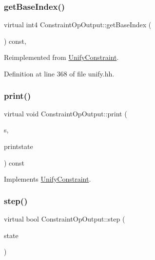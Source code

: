 \subsubsection{\texorpdfstring{getBaseIndex()}{getBaseIndex()}}
{\footnotesize\ttfamily virtual int4 Constraint\+Op\+Output\+::get\+Base\+Index (\begin{DoxyParamCaption}\item[{void}]{ }\end{DoxyParamCaption}) const\hspace{0.3cm}{\ttfamily [inline]}, {\ttfamily [virtual]}}



Reimplemented from \mbox{\hyperlink{class_unify_constraint_a44f0164f38ac1fdc44fc73ebe7678de1}{Unify\+Constraint}}.



Definition at line 368 of file unify.\+hh.

\mbox{\label{class_constraint_op_output_ab4486f3c60de93d81556e3283c38989c}} 
\subsubsection{\texorpdfstring{print()}{print()}}
{\footnotesize\ttfamily virtual void Constraint\+Op\+Output\+::print (\begin{DoxyParamCaption}\item[{ostream \&}]{s,  }\item[{\mbox{\hyperlink{class_unify_c_printer}{Unify\+C\+Printer}} \&}]{printstate }\end{DoxyParamCaption}) const\hspace{0.3cm}{\ttfamily [virtual]}}



Implements \mbox{\hyperlink{class_unify_constraint_a774f6a611a96384766cb8e8d8f5ff41f}{Unify\+Constraint}}.

\mbox{\label{class_constraint_op_output_aec6f2bec6b741072d41d44edb4308aa3}} 
\subsubsection{\texorpdfstring{step()}{step()}}
{\footnotesize\ttfamily virtual bool Constraint\+Op\+Output\+::step (\begin{DoxyParamCaption}\item[{\mbox{\hyperlink{class_unify_state}{Unify\+State}} \&}]{state }\end{DoxyParamCaption})\hspace{0.3cm}{\ttfamily [virtual]}}




